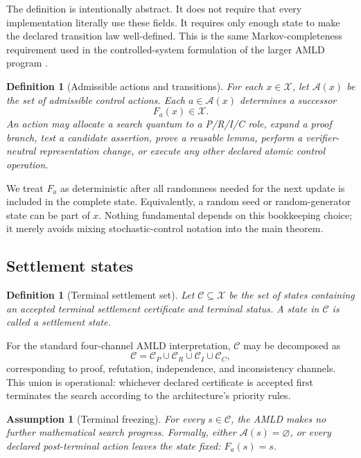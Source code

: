 \documentclass[11pt,letterpaper]{article}
\newtheorem{definition}[theorem]{Definition}
\newtheorem{assumption}[theorem]{Assumption}
\theoremstyle{remark}
\newcommand{\X}{\mathcal X}
\newcommand{\Cset}{\mathcal C}
\newcommand{\A}{\mathcal A}
\begin{document}
The definition is intentionally abstract. It does not require that every implementation literally use these fields. It requires only enough state to make the declared transition law well-defined. This is the same Markov-completeness requirement used in the controlled-system formulation of the larger AMLD program \cite{VSS,DATA3}.

\begin{definition}[Admissible actions and transitions]
For each $x\in\X$, let $\A(x)$ be the set of admissible control actions. Each $a\in\A(x)$ determines a successor
\[
F_a(x)\in\X.
\]
An action may allocate a search quantum to a P/R/I/C role, expand a proof branch, test a candidate assertion, prove a reusable lemma, perform a verifier-neutral representation change, or execute any other declared atomic control operation.
\end{definition}

We treat $F_a$ as deterministic after all randomness needed for the next update is included in the complete state. Equivalently, a random seed or random-generator state can be part of $x$. Nothing fundamental depends on this bookkeeping choice; it merely avoids mixing stochastic-control notation into the main theorem.

\subsection{Settlement states}

\begin{definition}[Terminal settlement set]
Let $\Cset\subseteq\X$ be the set of states containing an accepted terminal settlement certificate and terminal status. A state in $\Cset$ is called a \emph{settlement state}.
\end{definition}

For the standard four-channel AMLD interpretation, $\Cset$ may be decomposed as
\[
\Cset=\Cset_P\cup\Cset_R\cup\Cset_I\cup\Cset_C,
\]
corresponding to proof, refutation, independence, and inconsistency channels. This union is operational: whichever declared certificate is accepted first terminates the search according to the architecture's priority rules.

\begin{assumption}[Terminal freezing]\label{ass:freeze}
For every $s\in\Cset$, the AMLD makes no further mathematical search progress. Formally, either $\A(s)=\varnothing$, or every declared post-terminal action leaves the state fixed: $F_a(s)=s$.
\end{assumption}
\end{document}
